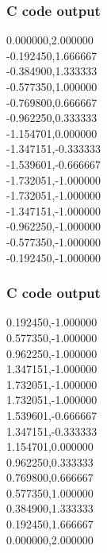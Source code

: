 \documentclass{beamer}
\begin{document}
\begin{frame}
\frametitle{C code output}
 0.000000,2.000000 \\
-0.192450,1.666667 \\
-0.384900,1.333333\\
-0.577350,1.000000\\
-0.769800,0.666667\\
-0.962250,0.333333\\
-1.154701,0.000000\\
-1.347151,-0.333333\\
-1.539601,-0.666667\\
-1.732051,-1.000000\\
-1.732051,-1.000000\\
-1.347151,-1.000000\\
-0.962250,-1.000000\\
-0.577350,-1.000000\\
-0.192450,-1.000000\\

\end{frame}

\begin{frame}
\frametitle{C code output}
0.192450,-1.000000\\
0.577350,-1.000000\\
0.962250,-1.000000\\
1.347151,-1.000000\\
1.732051,-1.000000\\
1.732051,-1.000000\\
1.539601,-0.666667\\
1.347151,-0.333333\\
1.154701,0.000000\\
0.962250,0.333333\\
0.769800,0.666667\\
0.577350,1.000000\\
0.384900,1.333333\\
0.192450,1.666667\\
0.000000,2.000000\\
 
\end{frame}
\end{document}

